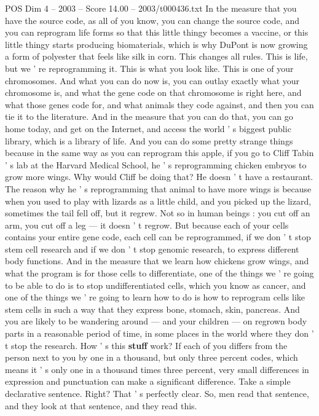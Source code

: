 \begin{textsample}{POS Dim 4 – 2003 – Score 14.00 – 2003/t000436.txt}
In the measure that you have the source code, as all of you know, you can change the source code, and you can reprogram life forms so that this little thingy becomes a vaccine, or this little thingy starts producing biomaterials, which is why DuPont is now growing a form of polyester that feels like silk in corn.
This changes all rules.
This is life, but we ' re reprogramming it.
This is what you look like.
This is one of your chromosomes.
And what you can do now is, you can outlay exactly what your chromosome is, and what the gene code on that chromosome is right here, and what those genes code for, and what animals they code against, and then you can tie it to the literature.
And in the measure that you can do that, you can go home today, and get on the Internet, and access the world ' s biggest public library, which is a library of life.
And you can do some pretty strange things because in the same way as you can reprogram this apple, if you go to Cliff Tabin ' s lab at the Harvard Medical School, he ' s reprogramming chicken embryos to grow more wings.
Why would Cliff be doing that?
He doesn ' t have a restaurant.
The reason why he ' s reprogramming that animal to have more wings is because when you used to play with lizards as a little child, and you picked up the lizard, sometimes the tail fell off, but it regrew.
Not so in human beings : you cut off an arm, you cut off a leg — it doesn ' t regrow.
But because each of your cells contains your entire gene code, each cell can be reprogrammed, if we don ' t stop stem cell research and if we don ' t stop genomic research, to express different body functions.
And in the measure that we learn how chickens grow wings, and what the program is for those cells to differentiate, one of the things we ' re going to be able to do is to stop undifferentiated cells, which you know as cancer, and one of the things we ' re going to learn how to do is how to reprogram cells like stem cells in such a way that they express bone, stomach, skin, pancreas.
And you are likely to be wandering around — and your children — on regrown body parts in a reasonable period of time, in some places in the world where they don ' t stop the research.
How ' s this \textbf{stuff} work?
If each of you differs from the person next to you by one in a thousand, but only three percent codes, which means it ' s only one in a thousand times three percent, very small differences in expression and punctuation can make a significant difference.
Take a simple declarative sentence.
Right?
That ' s perfectly clear.
So, men read that sentence, and they look at that sentence, and they read this.

\end{textsample}
